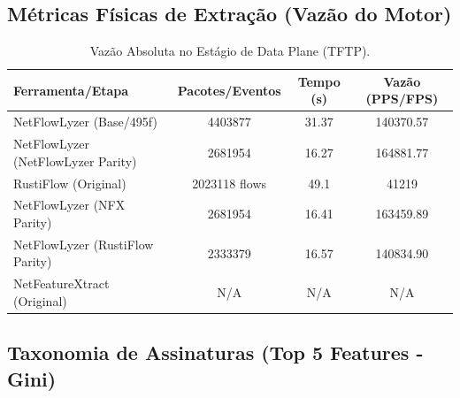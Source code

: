 \documentclass[11pt,a4paper]{article}
\begin{document}
\subsection{Métricas Físicas de Extração (Vazão do Motor)}
\begin{table}[H]
\centering
\begin{threeparttable}
\begin{tabular}{lccc}
\toprule
\textbf{Ferramenta/Etapa} & \textbf{Pacotes/Eventos} & \textbf{Tempo (s)} & \textbf{Vazão (PPS/FPS)} \\
\midrule
NetFlowLyzer (Base/495f) & 4403877 & 31.37 & 140370.57 \\
NetFlowLyzer (NetFlowLyzer Parity) & 2681954 & 16.27 & 164881.77 \\
RustiFlow (Original) & 2023118 flows & 49.1 & 41219 \\
NetFlowLyzer (NFX Parity) & 2681954 & 16.41 & 163459.89 \\
NetFlowLyzer (RustiFlow Parity) & 2333379 & 16.57 & 140834.90 \\
NetFeatureXtract (Original) & N/A & N/A & N/A \\
\bottomrule
\end{tabular}
\end{threeparttable}
\caption{Vazão Absoluta no Estágio de Data Plane (TFTP).}
\end{table}

\subsection{Taxonomia de Assinaturas (Top 5 Features - Gini)}
\begin{table}[H]
\centering
{}
\caption{Principais atributos de correlação estocástica por limiar dimensional (TFTP).}
\end{table}
\end{document}

